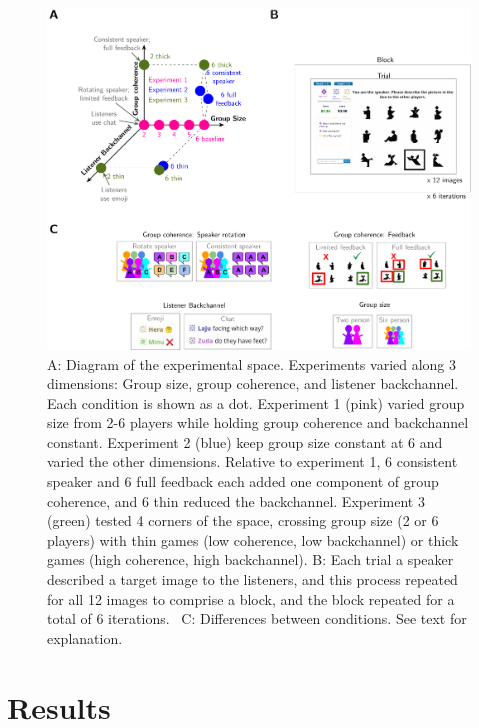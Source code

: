 \documentclass[
  english,
  a4paper,
]{article}
\begin{document}
\begin{figure}[t!]

{\centering \includegraphics[width=1\linewidth]{expt-diagram3} 

}

\caption{A: Diagram of the experimental space. Experiments varied along 3 dimensions: Group size, group coherence, and listener backchannel. Each condition is shown as a dot. Experiment 1 (pink) varied group size from 2-6 players while holding group coherence and backchannel constant. Experiment 2 (blue) keep group size constant at 6 and varied the other dimensions. Relative to experiment 1, 6 consistent speaker and 6 full feedback each added one component of group coherence, and 6 thin reduced the backchannel. Experiment 3 (green) tested 4 corners of the space, crossing group size (2 or 6 players) with thin games (low coherence, low backchannel) or thick games (high coherence, high backchannel).   B: Each trial a speaker described a target image to the listeners, and this process repeated for all 12 images to comprise a block, and the block repeated for a total of 6 iterations. \ C: Differences between conditions. See text for explanation.}\label{fig:diagram}
\end{figure}

\hypertarget{results}{%
\section{Results}\label{results}}
\end{document}
